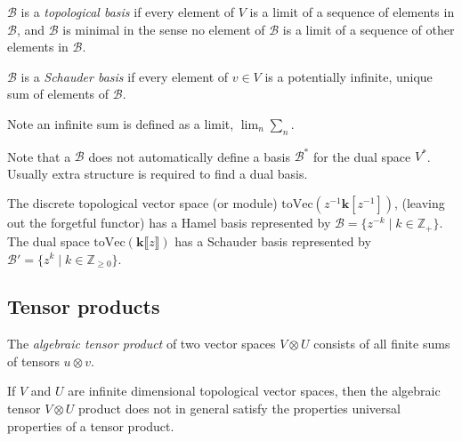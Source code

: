         
        \begin{defn}
        \( \mathcal{B}\) is a \emph{topological basis} if every element of \( V\) is a limit of a sequence of elements in \(\mathcal{B}\), and \( \mathcal{B}\) is minimal in the sense no element of \( \mathcal{B}\) is a limit of a sequence of other elements in \( \mathcal{B}\).
        \end{defn}
        
        
        \begin{defn}
        \( \mathcal{B}\) is a \emph{Schauder basis} if every element of \(v \in V\) is a potentially infinite, unique sum of elements of \( \mathcal{B}\).
        \end{defn}

        Note an infinite sum is defined as a limit, \(\lim_n \sum_{n}\). 
        
        
        \begin{rem} Note that a \( \mathcal{B}\) does not automatically define a basis \( \mathcal{B}^*\) for the dual space \( V^*\). Usually extra structure is required to find a dual basis.
        \end{rem}
        
        \begin{ex} 
        \label{ex:hamelandschaud}
        The discrete topological vector space (or module) \( \mathrm{toVec}(z^{-1} \mathbf{k}[z^{-1}])\), (leaving out the forgetful functor) has a Hamel basis represented by \(\mathcal{B}= \{ z^{-k}\; |\; k \in \mathbb{Z}_{+}\}\). The dual space \( \mathrm{toVec}(\mathbf{k} \lBrack z \rBrack )\) has a Schauder basis represented by \( \mathcal{B}' = \{ z^{k}\; | \; k \in \mathbb{Z}_{\geq 0}\}\).
        \end{ex}
        
        \fi 
    
        \subsection{Tensor products}
        \begin{defn} 
        \label{defn:algdual}
        The \emph{algebraic tensor product} of two vector spaces \(V \otimes U \) consists of all finite sums of tensors \( u \otimes v\). 
         \end{defn} 
         
        If \(V\) and \(U\) are infinite dimensional topological vector spaces, then the algebraic tensor \(V \otimes U\) product does not in general satisfy the properties universal properties of a tensor product.
         
